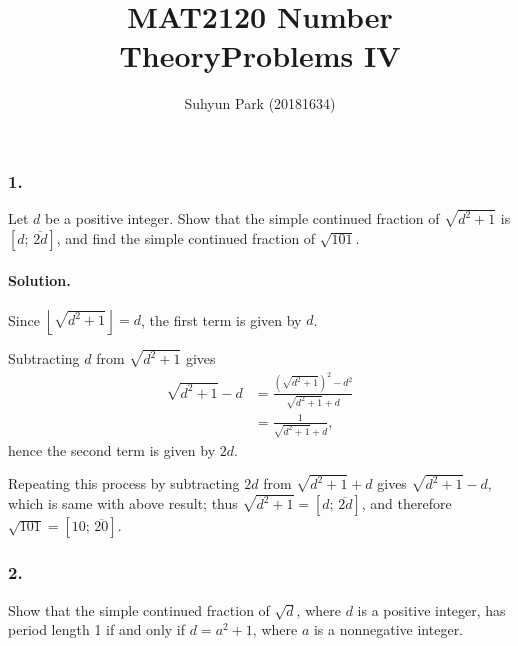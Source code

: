 



\title{MAT2120 Number Theory\newline\space Problems IV}
\author{Suhyun Park (20181634)}

\maketitle

\subsubsection{1.} Let $d$ be a positive integer. Show that the simple continued fraction of $\sqrt{d^2+1}$ is
$\left[d;\,\overline{2d}\right]$, and find the simple continued fraction of $\sqrt{101}$.

\paragraph{Solution.} Since $\left\lfloor\sqrt{d^2+1}\right\rfloor=d$, the first term is given by $d$.

Subtracting $d$ from $\sqrt{d^2+1}$ gives
\begin{align*}
    \sqrt{d^2+1}-d &= \frac{\left(\sqrt{d^2+1}\right)^2-d^2}{\sqrt{d^2+1}+d} \\
    &= \frac{1}{\sqrt{d^2+1}+d},
\end{align*}
hence the second term is given by $2d$.

Repeating this process by subtracting $2d$ from $\sqrt{d^2+1}+d$ gives $\sqrt{d^2+1}-d$, which is same with above result;
thus $\sqrt{d^2+1}=\left[d;\,\overline{2d}\right]$, and therefore $\sqrt{101}=\left[10;\,\overline{20}\right]$.

\subsubsection{2.} Show that the simple continued fraction of $\sqrt{d}$, where $d$ is a positive integer,
has period length 1 if and only if $d=a^2+1$, where $a$ is a nonnegative integer.

